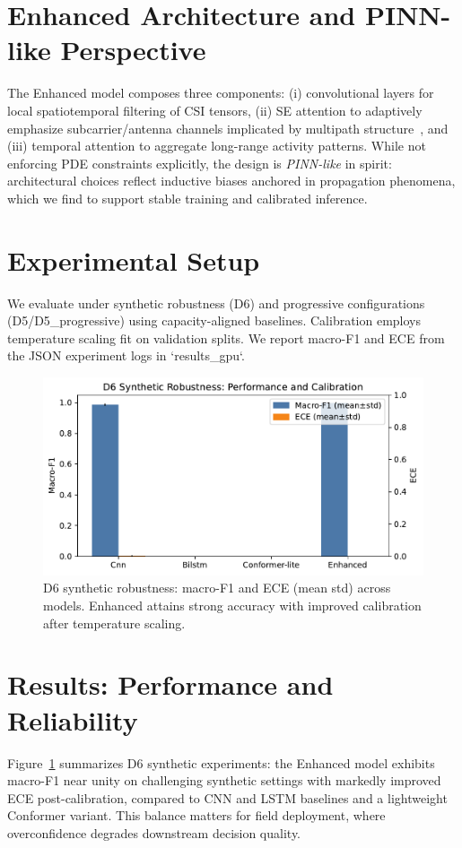 \documentclass[journal]{IEEEtran}
\begin{document}
\section{Enhanced Architecture and PINN-like Perspective}
The Enhanced model composes three components: (i) convolutional layers for local spatiotemporal filtering of CSI tensors, (ii) SE attention to adaptively emphasize subcarrier/antenna channels implicated by multipath structure~\cite{se_networks2018}, and (iii) temporal attention to aggregate long-range activity patterns. While not enforcing PDE constraints explicitly, the design is \emph{PINN-like} in spirit: architectural choices reflect inductive biases anchored in propagation phenomena, which we find to support stable training and calibrated inference.

\section{Experimental Setup}
We evaluate under synthetic robustness (D6) and progressive configurations (D5/D5\_progressive) using capacity-aligned baselines. Calibration employs temperature scaling fit on validation splits. We report macro-F1 and ECE from the JSON experiment logs in `results\_gpu`.

\begin{figure}[t]
\centering
\includegraphics[width=\columnwidth]{plots/d6_calibration_summary.pdf}
\caption{D6 synthetic robustness: macro-F1 and ECE (mean\,\textpm\,std) across models. Enhanced attains strong accuracy with improved calibration after temperature scaling.}
\label{fig:d6_cal}
\end{figure}

\section{Results: Performance and Reliability}
Figure~\ref{fig:d6_cal} summarizes D6 synthetic experiments: the Enhanced model exhibits macro-F1 near unity on challenging synthetic settings with markedly improved ECE post-calibration, compared to CNN and LSTM baselines and a lightweight Conformer variant. This balance matters for field deployment, where overconfidence degrades downstream decision quality.
\end{document}
